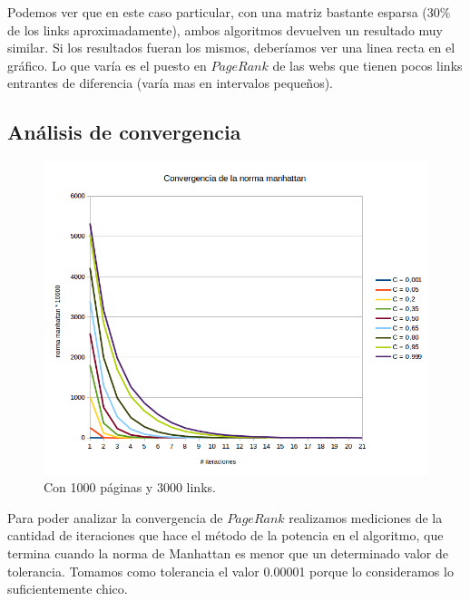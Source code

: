 Podemos ver que en este caso particular, con una matriz bastante esparsa (30\% de los links aproximadamente), ambos algoritmos devuelven un resultado muy similar. Si los resultados fueran los mismos, deberíamos ver una linea recta en el gráfico. Lo que varía es el puesto en $PageRank$ de las webs que tienen pocos links entrantes de diferencia (varía mas en intervalos pequeños). \\


\subsection{Análisis de convergencia}
\begin{figure}
  \vspace{-20pt}
  \begin{center}
    \includegraphics[scale= 0.6]{imagenes/convergencia1.png}
  \end{center}
  \vspace{-20pt}
   \caption{Con  1000 páginas y 3000 links.}
  \vspace{-10pt}
  \label{fig:img3}
\end{figure}

Para poder analizar la convergencia de $PageRank$ realizamos mediciones de la cantidad de iteraciones que hace el método de la potencia en el algoritmo, que termina cuando la norma de Manhattan es menor que un determinado valor de tolerancia. Tomamos como tolerancia el valor 0.00001 porque lo consideramos lo suficientemente chico.\\

